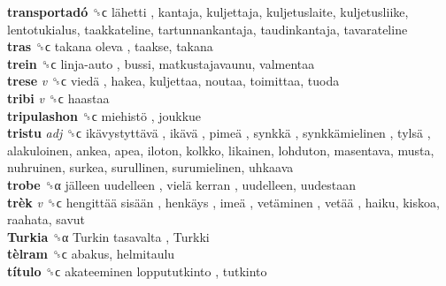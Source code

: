 \textbf{transportadó} ␝ϲ   lähetti , kantaja, kuljettaja, kuljetuslaite, kuljetusliike, lentotukialus, taakkateline, tartunnankantaja, taudinkantaja, tavarateline  \\
\textbf{tras} ␝ϲ   takana oleva , taakse, takana  \\
\textbf{trein} ␝ϲ   linja-auto , bussi, matkustajavaunu, valmentaa  \\
\textbf{trese} \emph{v}  ␝ϲ   viedä , hakea, kuljettaa, noutaa, toimittaa, tuoda  \\
\textbf{tribi} \emph{v}  ␝ϲ  haastaa  \\
\textbf{tripulashon} ␝ϲ   miehistö , joukkue  \\
\textbf{tristu} \emph{adj}  ␝ϲ   ikävystyttävä ,  ikävä ,  pimeä ,  synkkä ,  synkkämielinen ,  tylsä , alakuloinen, ankea, apea, iloton, kolkko, likainen, lohduton, masentava, musta, nuhruinen, surkea, surullinen, surumielinen, uhkaava  \\
\textbf{trobe} ␝α   jälleen uudelleen ,  vielä kerran , uudelleen, uudestaan  \\
\textbf{trèk} \emph{v}  ␝ϲ   hengittää sisään ,  henkäys ,  imeä ,  vetäminen ,  vetää , haiku, kiskoa, raahata, savut  \\
\textbf{Turkia} ␝α   Turkin tasavalta ,  Turkki   \\
\textbf{tèlram} ␝ϲ  abakus, helmitaulu  \\
\textbf{título} ␝ϲ   akateeminen loppututkinto , tutkinto  \\
